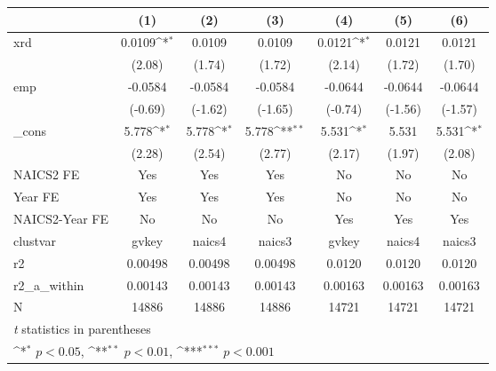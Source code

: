 {
\def\sym#1{\ifmmode^{#1}\else\(^{#1}\)\fi}
\begin{tabular}{l*{6}{c}}
\hline\hline
            &\multicolumn{1}{c}{(1)}         &\multicolumn{1}{c}{(2)}         &\multicolumn{1}{c}{(3)}         &\multicolumn{1}{c}{(4)}         &\multicolumn{1}{c}{(5)}         &\multicolumn{1}{c}{(6)}         \\
\hline
xrd         &      0.0109\sym{*}  &      0.0109         &      0.0109         &      0.0121\sym{*}  &      0.0121         &      0.0121         \\
            &      (2.08)         &      (1.74)         &      (1.72)         &      (2.14)         &      (1.72)         &      (1.70)         \\
[1em]
emp         &     -0.0584         &     -0.0584         &     -0.0584         &     -0.0644         &     -0.0644         &     -0.0644         \\
            &     (-0.69)         &     (-1.62)         &     (-1.65)         &     (-0.74)         &     (-1.56)         &     (-1.57)         \\
[1em]
\_cons      &       5.778\sym{*}  &       5.778\sym{*}  &       5.778\sym{**} &       5.531\sym{*}  &       5.531         &       5.531\sym{*}  \\
            &      (2.28)         &      (2.54)         &      (2.77)         &      (2.17)         &      (1.97)         &      (2.08)         \\
[1em]
NAICS2 FE   &         Yes         &         Yes         &         Yes         &          No         &          No         &          No         \\
[1em]
Year FE     &         Yes         &         Yes         &         Yes         &          No         &          No         &          No         \\
[1em]
NAICS2-Year FE&          No         &          No         &          No         &         Yes         &         Yes         &         Yes         \\
\hline
clustvar    &       gvkey         &      naics4         &      naics3         &       gvkey         &      naics4         &      naics3         \\
r2          &     0.00498         &     0.00498         &     0.00498         &      0.0120         &      0.0120         &      0.0120         \\
r2\_a\_within &     0.00143         &     0.00143         &     0.00143         &     0.00163         &     0.00163         &     0.00163         \\
N           &       14886         &       14886         &       14886         &       14721         &       14721         &       14721         \\
\hline\hline
\multicolumn{7}{l}{\footnotesize \textit{t} statistics in parentheses}\\
\multicolumn{7}{l}{\footnotesize \sym{*} \(p<0.05\), \sym{**} \(p<0.01\), \sym{***} \(p<0.001\)}\\
\end{tabular}
}
